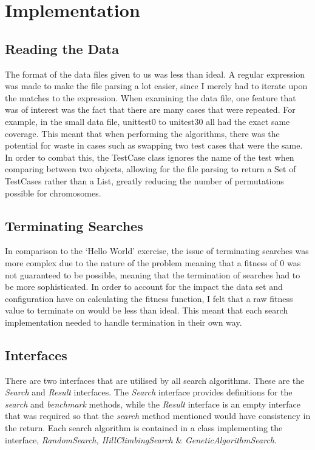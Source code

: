 \documentclass[11pt, a4paper]{article}
\begin{document}
\section{Implementation}
\label{sec:implementation}
\subsection{Reading the Data}
\label{sub:reading_data}
The format of the data files given to us was less than ideal. A regular
expression was made to make the file parsing a lot easier, since I merely had to
iterate upon the matches to the expression. When examining the data file, one
feature that was of interest was the fact that there are many cases that were
repeated. For example, in the small data file, unittest0 to unitest30 all had
the exact same coverage. This meant that when performing the algorithms, there
was the potential for waste in cases such as swapping two test cases that were
the same. In order to combat this, the TestCase class ignores the name of the
test when comparing between two objects, allowing for the file parsing to return
a Set of TestCases rather than a List, greatly reducing the number of
permutations possible for chromosomes.

\subsection{Terminating Searches}
\label{sub:terminating}
In comparison to the `Hello World' exercise, the issue of terminating searches
was more complex due to the nature of the problem meaning that a fitness of 0
was not guaranteed to be possible, meaning that the termination of searches had
to be more sophisticated. In order to account for the impact the data set and
configuration have on calculating the fitness function, I felt that a raw
fitness value to terminate on would be less than ideal. This meant that each
search implementation needed to handle termination in their own way.

\subsection{Interfaces}
\label{sub:interfaces}
There are two interfaces that are utilised by all search algorithms. These are
the \emph{Search} and \emph{Result} interfaces. The \emph{Search} interface
provides definitions for the \emph{search} and \emph{benchmark} methods, while
the \emph{Result} interface is an empty interface that was required so that the
\emph{search} method mentioned would have consistency in the return. Each search
algorithm is contained in a class implementing the interface, \emph{RandomSearch,
HillClimbingSearch} \& \emph{GeneticAlgorithmSearch}.
\end{document}
